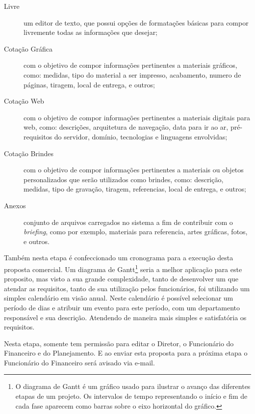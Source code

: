 \documentclass[
  12pt,            %
  openany,
  oneside,
  a4paper,         %
  english,      %
  brazil
]{article}
\numberwithin{figure}{section}
\numberwithin{table}{section}
\begin{document}
\begin{description}
  \item[Livre] um editor de texto, que possui opções de formatações básicas para compor livremente todas as informações que desejar;

  \item[Cotação Gráfica] com o objetivo de compor informações pertinentes a materiais gráficos, como: medidas, tipo do material a ser impresso, acabamento, numero de páginas, tiragem, local de entrega, e outros;

  \item[Cotação Web] com o objetivo de compor informações pertinentes a materiais digitais para web, como: descrições, arquitetura de navegação, data para ir ao ar, pré-requisitos do servidor, domínio, tecnologias e linguagens envolvidas;

  \item[Cotação Brindes] com o objetivo de compor informações pertinentes a materiais ou objetos personalizados que serão utilizados como brindes, como: descrição, medidas, tipo de gravação, tiragem, referencias, local de entrega, e outros;

  \item[Anexos] conjunto de arquivos carregados no sistema a fim de contribuir com o \textit{briefing}, como por exemplo, materiais para referencia, artes gráficas, fotos, e outros.
\end{description}

Também nesta etapa é confeccionado um cronograma para a execução desta proposta comercial. Um diagrama de Gantt\footnote{O diagrama de Gantt é um gráfico usado para ilustrar o avanço das diferentes etapas de um projeto. Os intervalos de tempo representando o início e fim de cada fase aparecem como barras sobre o eixo horizontal do gráfico.} seria a melhor aplicação para este proposito, mas visto a sua grande complexidade, tanto de desenvolver um que atendar as requisitos, tanto de sua utilização pelos funcionários, foi utilizando um simples calendário em visão anual. Neste calendário é possível selecionar um período de dias e atribuir um evento para este período, com um departamento responsável e sua descrição. Atendendo de maneira mais simples e satisfatória os requisitos.

Nesta etapa, somente tem permissão para editar o Diretor, o Funcionário do Financeiro e do Planejamento. E ao enviar esta proposta para a próxima etapa o Funcionário do Financeiro será avisado via e-mail.
\end{document}
